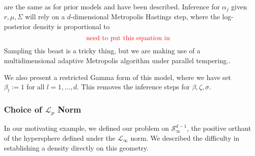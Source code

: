   are the same as for prior models and have been described.  Inference for $\alpha_j$ given
  $r, \mu,\Sigma$ will rely on a $d$-dimensional Metropolis Hastings step, where the log-posterior
  density is proportional to
  \begin{equation}
    \label{eqn:dplnlp}
    \text{{\color{red} need to put this equation in}}
  \end{equation}
  Sampling this beast is a tricky thing, but we are making use of a multidimensional adaptive Metropolis
  algorithm  under parallel
  tempering..

We also present a restricted Gamma form of this model, where we have set $\beta_l := 1$ for all
  $l = 1,\ldots,d$.  This removes the inference steps for $\beta,\zeta,\sigma$.


\subsubsection{Choice of $\mathcal{L}_p$ Norm}
In our motivating example, we defined our problem on $\mathcal{S}_{\infty}^{d-1}$, the positive orthant
  of the hypersphere defined under the $\mathcal{L}_{\infty}$ norm.  We described the difficulty in
  establishing a density directly on this geometry.  






